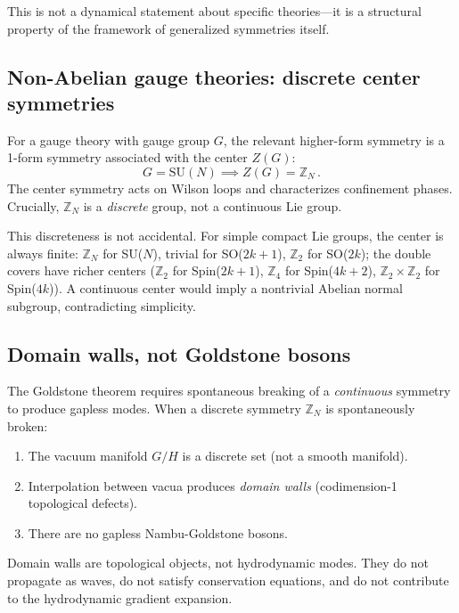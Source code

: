 \documentclass[aps,prl,twocolumn,superscriptaddress,showpacs]{revtex4-2}
\begin{document}
This is not a dynamical statement about specific theories---it is a
structural property of the framework of generalized symmetries itself.

\subsection{Non-Abelian gauge theories: discrete center symmetries}

For a gauge theory with gauge group $G$, the relevant higher-form
symmetry is a 1-form symmetry associated with the center $Z(G)$:
\begin{equation}
    G = \text{SU}(N) \implies Z(G) = \mathbb{Z}_N \,.
\end{equation}
The center symmetry acts on Wilson loops and characterizes confinement
phases. Crucially, $\mathbb{Z}_N$ is a \emph{discrete} group, not a
continuous Lie group.

This discreteness is not accidental. For simple compact Lie groups, the center
is always finite: $\mathbb{Z}_N$ for SU($N$), trivial for
SO($2k+1$), $\mathbb{Z}_2$ for SO($2k$); the double covers have richer centers
($\mathbb{Z}_2$ for Spin($2k+1$), $\mathbb{Z}_4$ for Spin($4k+2$),
$\mathbb{Z}_2 \times \mathbb{Z}_2$ for Spin($4k$)). A
continuous center would imply a nontrivial Abelian normal subgroup,
contradicting simplicity.

\subsection{Domain walls, not Goldstone bosons}

The Goldstone theorem requires spontaneous breaking of a
\emph{continuous} symmetry to produce gapless modes. When a discrete
symmetry $\mathbb{Z}_N$ is spontaneously broken:

\begin{enumerate}
    \item The vacuum manifold $G/H$ is a discrete set (not a smooth manifold).
    \item Interpolation between vacua produces \emph{domain walls} (codimension-1 topological defects).
    \item There are no gapless Nambu-Goldstone bosons.
\end{enumerate}

Domain walls are topological objects, not hydrodynamic modes. They do
not propagate as waves, do not satisfy conservation equations, and do
not contribute to the hydrodynamic gradient expansion.
\end{document}
